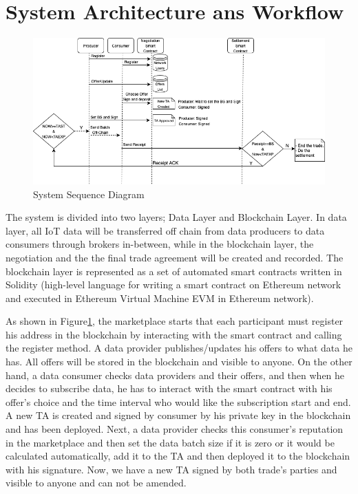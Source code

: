 \documentclass[letterpaper, 10 pt, conference]{ieeeconf}  %
\begin{document}
\section{System Architecture ans Workflow} \label{Arch}

\begin{figure}
  \caption{System Sequence Diagram}
  \label{SSD}
  \includegraphics[width=.7\textwidth]{SystemArchWithBackground}
  \centering
\end{figure}

The system is divided into two layers; Data Layer and Blockchain Layer. In data layer, all IoT data will be transferred off chain from data producers to data consumers through brokers in-between, while in the blockchain layer, the negotiation and the the final trade agreement will be created and recorded. The blockchain layer is represented as a set of automated smart contracts written in Solidity (high-level language for writing a smart contract on Ethereum network and executed in Ethereum Virtual Machine EVM in Ethereum network).

As shown in Figure\ref{SSD}, the marketplace starts that each participant must register his address in the blockchain by interacting with the smart contract and calling the register method. A data provider publishes/updates his offers to what data he has. All offers will be stored in the blockchain and visible to anyone. On the other hand, a data consumer checks data providers and their offers, and then when he decides to subscribe data, he has to interact with the smart contract with his offer’s choice and the time interval who would like the subscription start and end. A new TA is created and signed by consumer by his private key in the blockchain and has been deployed. Next, a data provider checks this consumer’s reputation in the marketplace and then set the data batch size if it is zero or it would be calculated automatically, add it to the TA and then deployed it to the blockchain with his signature. Now, we have a new TA signed by both trade’s parties and visible to anyone and can not be amended. 
\end{document}
